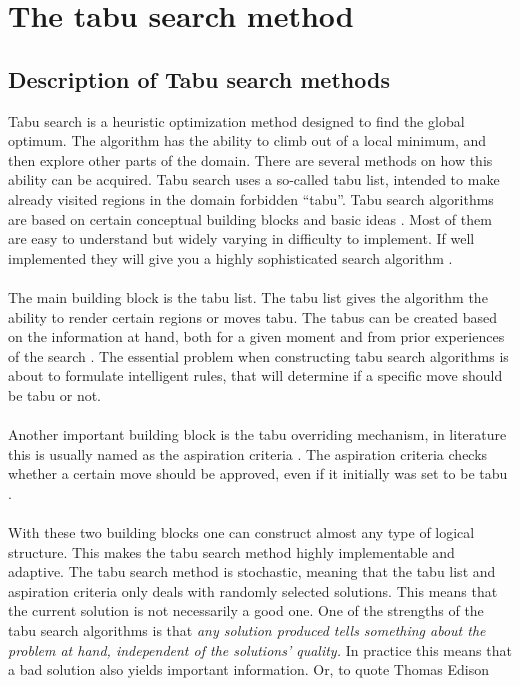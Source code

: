 \pagebreak
\section{The tabu search method}
\subsection{Description of Tabu search methods}
Tabu search is a heuristic optimization method designed to find the global optimum. The algorithm has the ability to climb out of a local minimum, and then explore other parts of the domain. There are several methods on how this ability can be acquired. Tabu search uses a so-called tabu list, intended to make already visited regions in the domain forbidden ``tabu''. Tabu search algorithms are based on certain conceptual building blocks and basic ideas \cite{Glover1} \cite{Glover3} \cite{Glover4}. Most of them are easy to understand but widely varying in difficulty to implement. If well implemented they will give you a highly sophisticated search algorithm \cite{canada} \cite{Glover2}. \\
\\The main building block is the tabu list. The tabu list gives the algorithm the ability to render certain regions or moves tabu. The tabus can be created based on the information at hand, both for a given moment and from prior experiences of the search \cite{canada}. The essential problem when constructing tabu search algorithms is about to formulate intelligent rules, that will determine if a specific move should be tabu or not.\\
\\Another important building block is the tabu overriding mechanism, in literature this is usually named as the aspiration criteria . The aspiration criteria checks whether a certain move should be approved, even if it initially was set to be tabu \cite{canada} \cite{Glover2}.\\
\\With these two building blocks one can construct almost any type of logical structure. This makes the tabu search method highly implementable and adaptive. The tabu search method is stochastic, meaning that the tabu list and aspiration criteria only deals with randomly selected solutions. This means that the current solution is not necessarily a good one. One of the strengths of the tabu search algorithms is that \emph{any solution produced tells something about the problem at hand, independent of the solutions' quality.} In practice this means that a bad solution also yields important information.  Or, to quote Thomas Edison 
